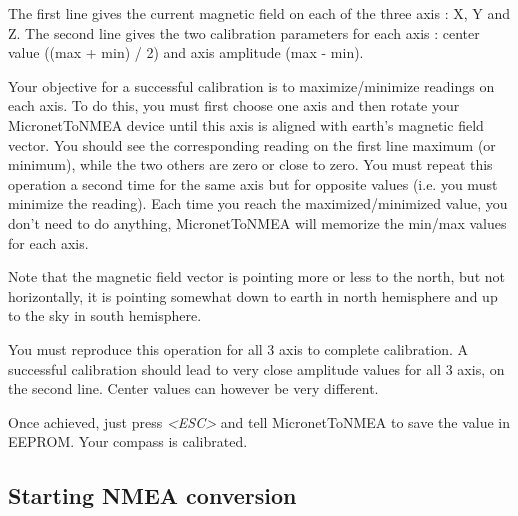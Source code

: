 \documentclass{report}
\begin{document}
The first line gives the current magnetic field on each of the three axis : X, Y and Z.
The second line gives the two calibration parameters for each axis : center value ((max + min) / 2) and axis amplitude (max - min).

Your objective for a successful calibration is to maximize/minimize readings on each axis. To do this, you must first choose one axis and then rotate your MicronetToNMEA device until this axis is aligned with earth's magnetic field vector. You should see the corresponding reading on the first line maximum (or minimum), while the two others are zero or close to zero.
You must repeat this operation a second time for the same axis but for opposite values (i.e. you must minimize the reading). Each time you reach the maximized/minimized value, you don't need to do anything, MicronetToNMEA will memorize the min/max values for each axis.

Note that the magnetic field vector is pointing more or less to the north, but not horizontally, it is pointing somewhat down to earth in north hemisphere and up to the sky in south hemisphere.

You must reproduce this operation for all 3 axis to complete calibration.
A successful calibration should lead to very close amplitude values for all 3 axis, on the second line. Center values can however be very different.

Once achieved, just press \emph{<ESC>} and tell MicronetToNMEA to save the value in EEPROM. Your compass is calibrated.

\subsection{Starting NMEA conversion}
\end{document}
